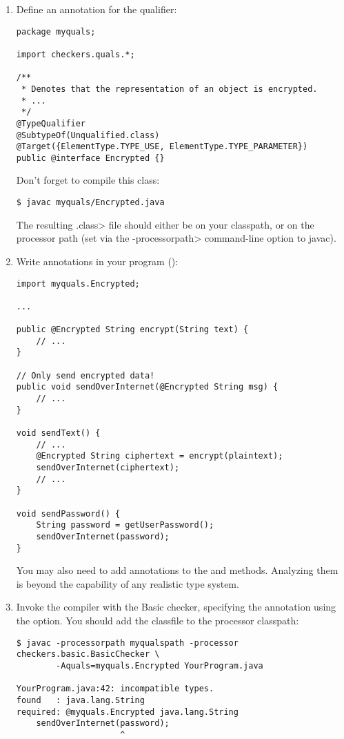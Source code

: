 \begin{enumerate}
\item
 Define an annotation for the  qualifier:

\begin{Verbatim}
package myquals;

import checkers.quals.*;

/**
 * Denotes that the representation of an object is encrypted.
 * ...
 */
@TypeQualifier
@SubtypeOf(Unqualified.class)
@Target({ElementType.TYPE_USE, ElementType.TYPE_PARAMETER})
public @interface Encrypted {}
\end{Verbatim}

Don't forget to compile this class:

\begin{Verbatim}
$ javac myquals/Encrypted.java
\end{Verbatim}

The resulting \<.class> file should either be on your classpath, or on the
processor path (set via the \<-processorpath> command-line option to javac).

\item 
  Write  annotations in your program ():

\begin{Verbatim}
import myquals.Encrypted;

...

public @Encrypted String encrypt(String text) {
    // ...
}

// Only send encrypted data!
public void sendOverInternet(@Encrypted String msg) {
    // ...
}

void sendText() {
    // ...
    @Encrypted String ciphertext = encrypt(plaintext);
    sendOverInternet(ciphertext);
    // ...
}

void sendPassword() {
    String password = getUserPassword();
    sendOverInternet(password);
}
\end{Verbatim}

You may also need to add  annotations to the
 and  methods.  Analyzing them is beyond the
capability of any realistic type system.

\item
  Invoke the compiler with the Basic checker, specifying the
   annotation using the  option.
  You should add the  classfile to the processor classpath:

\begin{Verbatim}
$ javac -processorpath myqualspath -processor checkers.basic.BasicChecker \
        -Aquals=myquals.Encrypted YourProgram.java

YourProgram.java:42: incompatible types.
found   : java.lang.String
required: @myquals.Encrypted java.lang.String
    sendOverInternet(password);
                     ^
\end{Verbatim}

\end{enumerate}


